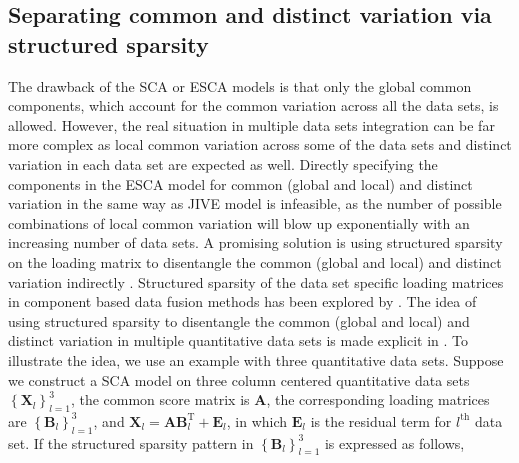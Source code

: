 \subsection{Separating common and distinct variation via structured sparsity}
The drawback of the SCA or ESCA models is that only the global common components, which account for the common variation across all the data sets, is allowed. However, the real situation in multiple data sets integration can be far more complex as local common variation across some of the data sets and distinct variation in each data set are expected as well. Directly specifying the components in the ESCA model for common (global and local) and distinct variation in the same way as JIVE model \cite{lock2013joint} is infeasible, as the number of possible combinations of local common variation will blow up exponentially with an increasing number of data sets. A promising solution is using structured sparsity on the loading matrix to disentangle the common (global and local) and distinct variation indirectly \cite{klami2015group,gaynanova2017structural}. Structured sparsity of the data set specific loading matrices in component based data fusion methods has been explored by \cite{van2011flexible,acar2015data}. The idea of using structured sparsity to disentangle the common (global and local) and distinct variation in multiple quantitative data sets is made explicit in \cite{klami2015group,gaynanova2017structural}. To illustrate the idea, we use an example with three quantitative data sets. Suppose we construct a SCA model on three column centered quantitative data sets $\left\{\mathbf{X}_l \right\}_{l=1}^{3}$, the common score matrix is $\mathbf{A}$, the corresponding loading matrices are $\left\{\mathbf{B}_l \right\}_{l=1}^{3}$, and $\mathbf{X}_l = \mathbf{A}\mathbf{B}_{l}^{\text{T}} + \mathbf{E}_l$, in which $\mathbf{E}_l$ is the residual term for $l^{\text{th}}$ data set. If the structured sparsity pattern in $\left\{\mathbf{B}_l \right\}_{l=1}^{3}$ is expressed as follows,

